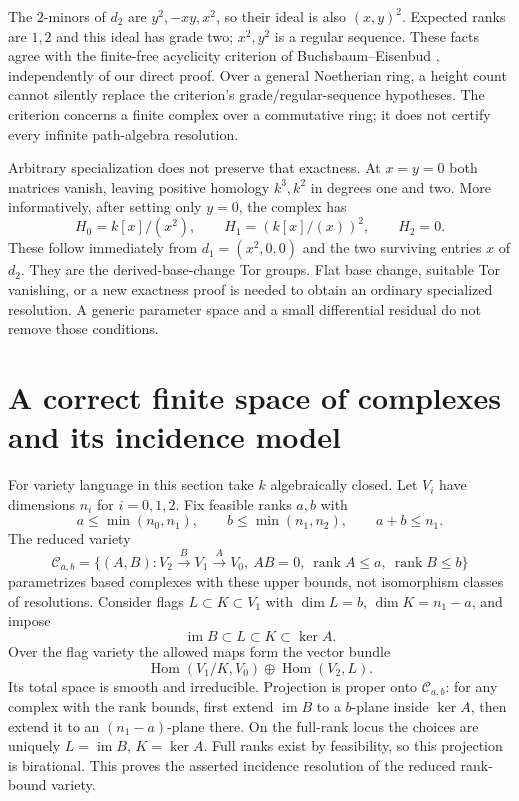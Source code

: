 \documentclass[11pt,oneside,openany]{book}
\theoremstyle{definition}\newtheorem{definition}[theorem]{Definition}
\theoremstyle{remark}\newtheorem{remark}[theorem]{Remark}
\begin{document}
The $2$-minors of $d_2$ are $y^2,-xy,x^2$, so their ideal is also
$(x,y)^2$. Expected ranks are $1,2$ and this ideal has grade two;
$x^2,y^2$ is a regular sequence. These facts agree with the finite-free
acyclicity criterion of Buchsbaum--Eisenbud \cite{PersBE}, independently
of our direct proof. Over a general Noetherian ring, a height count cannot
silently replace the criterion's grade/regular-sequence hypotheses.
The criterion concerns a finite complex over a commutative ring; it does
not certify every infinite path-algebra resolution.

Arbitrary specialization does not preserve that exactness. At $x=y=0$
both matrices vanish, leaving positive homology $k^3,k^2$ in degrees
one and two. More informatively, after setting only $y=0$, the complex
has
\[
 H_0=k[x]/(x^2),\qquad H_1=(k[x]/(x))^2,\qquad H_2=0.
\]
These follow immediately from $d_1=(x^2,0,0)$ and the two surviving
entries $x$ of $d_2$. They are the derived-base-change Tor groups.
Flat base change, suitable Tor vanishing, or a new exactness proof is
needed to obtain an ordinary specialized resolution. A generic parameter
space and a small differential residual do not remove those conditions.

\section{A correct finite space of complexes and its incidence model}
For variety language in this section take $k$ algebraically closed.
Let $V_i$ have dimensions $n_i$ for $i=0,1,2$. Fix feasible ranks
$a,b$ with
\[
 a\le\min(n_0,n_1),\qquad b\le\min(n_1,n_2),\qquad a+b\le n_1.
\]
The reduced variety
\[
 \mathcal C_{a,b}=\{(A,B):V_2\xrightarrow B V_1\xrightarrow A V_0,
       \ AB=0,\ \operatorname{rank}A\le a,\ \operatorname{rank}B\le b\}
\]
parametrizes based complexes with these upper bounds, not isomorphism
classes of resolutions. Consider flags
$L\subset K\subset V_1$ with $\dim L=b$, $\dim K=n_1-a$, and impose
\[
 \operatorname{im}B\subset L\subset K\subset\ker A.
\]
Over the flag variety the allowed maps form the vector bundle
\[
 \operatorname{Hom}(V_1/K,V_0)\oplus\operatorname{Hom}(V_2,L).
\]
Its total space is smooth and irreducible. Projection is proper onto
$\mathcal C_{a,b}$: for any complex with the rank bounds, first extend
$\operatorname{im}B$ to a $b$-plane inside $\ker A$, then extend it to an
$(n_1-a)$-plane there. On the full-rank locus the choices are uniquely
$L=\operatorname{im}B$, $K=\ker A$. Full ranks exist by feasibility,
so this projection is birational. This proves the asserted incidence
resolution of the reduced rank-bound variety.
\end{document}
